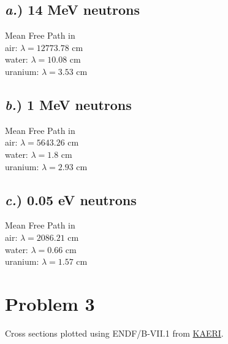 \documentclass{article}
\newcommand{\tab}{\-\hspace{1cm}}
\begin{document}
\begin{multicols}{3}

\subsection*{\textit{a.}) \small 14 MeV neutrons}
Mean Free Path in\\
	\tab air:  $\lambda = 12773.78$ cm\\
	\tab water:  $\lambda = 10.08$ cm\\
	\tab uranium:  $\lambda = 3.53$ cm\\

\subsection*{\textit{b.}) \small 1 MeV neutrons}
Mean Free Path in\\
	\tab air:  $\lambda = 5643.26$ cm\\
	\tab water:  $\lambda = 1.8$ cm\\
	\tab uranium:  $\lambda = 2.93$ cm\\

\subsection*{\textit{c.}) \small 0.05 eV neutrons}
Mean Free Path in\\
	\tab air:  $\lambda = 2086.21$ cm\\
	\tab water:  $\lambda = 0.66$ cm\\
	\tab uranium:  $\lambda = 1.57$ cm\\

\end{multicols}





\section*{Problem 3}

Cross sections plotted using ENDF/B-VII.1 from \href{http://atom.kaeri.re.kr/nuchart/}{KAERI}.
\end{document}
